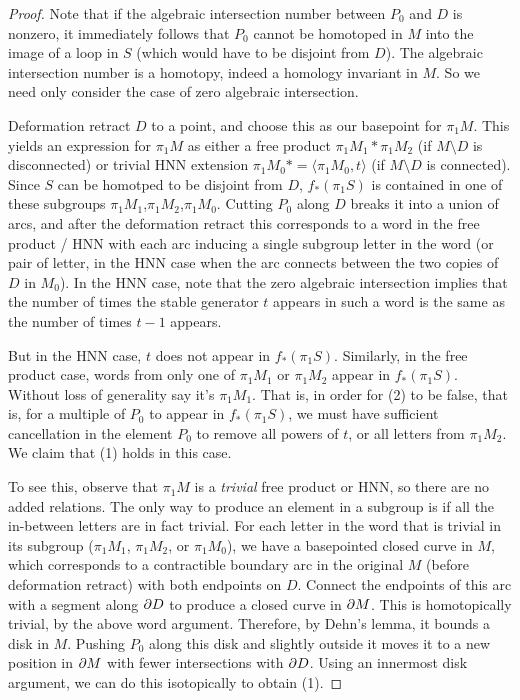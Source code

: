 \begin{proof}

Note that if the algebraic intersection number between $P_0$ and $D$ is
nonzero, it immediately follows that $P_0$ cannot be homotoped in $M$ into the
image of a loop in $S$ (which would have to be disjoint from $D$). The
algebraic intersection number is a homotopy, indeed a homology invariant in
$M$.  So we need only consider the case of zero algebraic intersection.

Deformation retract $D$ to a point, and choose this as our basepoint for
$\pi_1M$.  This yields an expression for $\pi_1M$ as either a free product
$\pi_1M_1 * \pi_1M_2$ (if $M \setminus D$ is disconnected) or trivial HNN
extension $\pi_1M_0 * = \langle\pi_1M_0,t\rangle$ (if $M \setminus D$ is
connected).  Since $S$ can be homotped to be disjoint from $D$, $f_* (\pi_1S)$
is contained in one of these subgroups $\pi_1M_1$,$\pi_1M_2$,$\pi_1M_0$.
Cutting $P_0$ along $D$ breaks it into a union of arcs, and after the
deformation retract this corresponds to a word in the free product / HNN with
each arc inducing a single subgroup letter in the word (or pair of letter, in
the HNN case when the arc connects between the two copies of $D$ in $M_0$).  In
the HNN case, note that the zero algebraic intersection implies that the number
of times the stable generator $t$ appears in such a word is the same as the
number of times $t-1$ appears.

But in the HNN case, $t$ does not appear in $f_*(\pi_1S)$.  Similarly, in the
free product case, words from only one of $\pi_1M_1$ or $\pi_1M_2$ appear in
$f_*(\pi_1S)$.  Without loss of generality say it's $\pi_1M_1$. That is, in
order for (2) to be false, that is, for a multiple of $P_0$ to appear in
$f_*(\pi_1S)$, we must have sufficient cancellation in the element $P_0$ to
remove all powers of $t$, or all letters from $\pi_1M_2$. We claim that (1)
holds in this case.

To see this, observe that $\pi_1M$ is a \emph{trivial} free product or HNN, so
there are no added relations. The only way to produce an element in a subgroup
is if all the in-between letters are in fact trivial. For each letter in the
word that is trivial in its subgroup ($\pi_1M_1$, $\pi_1M_2$, or $\pi_1M_0$),
we have a basepointed closed curve in $M$, which corresponds to a contractible
boundary arc in the original $M$ (before deformation retract) with both
endpoints on $D$.  Connect the endpoints of this arc with a segment along $\partial
D$ to produce a closed curve in $\partial M$. This is homotopically trivial, by the
above word argument.  Therefore, by Dehn's lemma, it bounds a disk in $M$.
Pushing $P_0$ along this disk and slightly outside it moves it to a new
position in $\partial M$ with fewer intersections with $\partial D$. Using an innermost
disk argument, we can do this isotopically to obtain (1).

\end{proof}

